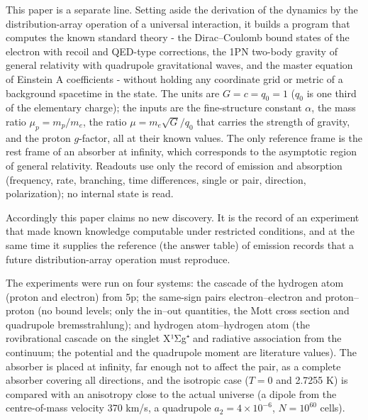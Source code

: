 \documentclass[
  a4paper,
]{article}
\begin{document}
This paper is a separate line. Setting aside the derivation of the
dynamics by the distribution-array operation of a universal interaction,
it builds a program that computes the known standard theory - the
Dirac--Coulomb bound states of the electron with recoil and QED-type
corrections, the 1PN two-body gravity of general relativity with
quadrupole gravitational waves, and the master equation of Einstein A
coefficients - without holding any coordinate grid or metric of a
background spacetime in the state. The units are \(G=c=q_0=1\) (\(q_0\)
is one third of the elementary charge); the inputs are the
fine-structure constant \(\alpha\), the mass ratio \(\mu_p=m_p/m_e\),
the ratio \(\mu=m_e\sqrt{G}/q_0\) that carries the strength of gravity,
and the proton \(g\)-factor, all at their known values. The only
reference frame is the rest frame of an absorber at infinity, which
corresponds to the asymptotic region of general relativity. Readouts use
only the record of emission and absorption (frequency, rate, branching,
time differences, single or pair, direction, polarization); no internal
state is read.

Accordingly this paper claims no new discovery. It is the record of an
experiment that made known knowledge computable under restricted
conditions, and at the same time it supplies the reference (the answer
table) of emission records that a future distribution-array operation
must reproduce.

The experiments were run on four systems: the cascade of the hydrogen
atom (proton and electron) from 5p; the same-sign pairs
electron--electron and proton--proton (no bound levels; only the in--out
quantities, the Mott cross section and quadrupole bremsstrahlung); and
hydrogen atom--hydrogen atom (the rovibrational cascade on the singlet
X¹Σg⁺ and radiative association from the continuum; the potential and
the quadrupole moment are literature values). The absorber is placed at
infinity, far enough not to affect the pair, as a complete absorber
covering all directions, and the isotropic case (\(T=0\) and 2.7255 K)
is compared with an anisotropy close to the actual universe (a dipole
from the centre-of-mass velocity 370 km/s, a quadrupole
\(a_2=4\times10^{-6}\), \(N=10^{60}\) cells).
\end{document}
